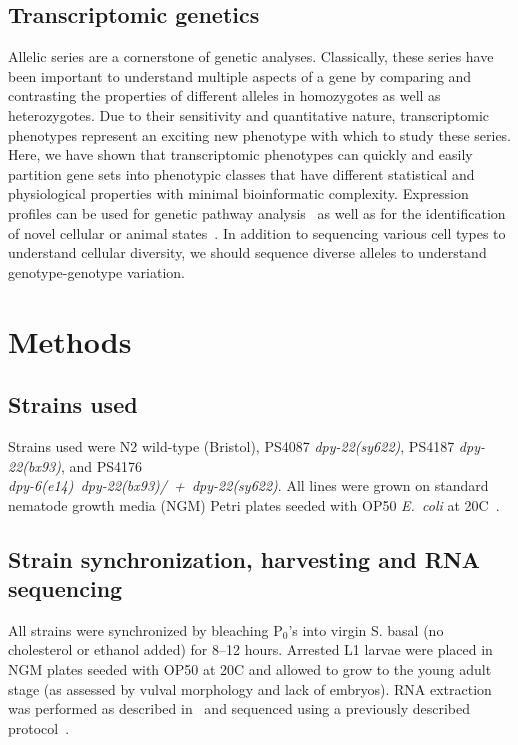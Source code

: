 \documentclass[10pt, twocolumn]{article}
\newcommand{\ecol}{\emph{E.~coli}}
\newcommand{\gene}[1]{\mbox{\emph{#1}}}
\begin{document}
\subsection*{Transcriptomic genetics}
Allelic series are a cornerstone of genetic analyses. Classically, these series
have been important to understand multiple aspects of a gene by comparing and
contrasting the properties of different alleles in homozygotes as well as
heterozygotes. Due to their sensitivity and quantitative nature, transcriptomic
phenotypes represent an exciting new phenotype with which to study these series.
Here, we have shown that transcriptomic phenotypes can quickly and easily
partition gene sets into phenotypic classes that have different statistical and
physiological properties with minimal bioinformatic complexity. Expression
profiles can be used for genetic pathway analysis~\cite{Dixit2016} as well as
for the identification of novel cellular or animal
states~\cite{Angeles-Albores2017,Villani2017}. In addition to sequencing
various cell types to understand cellular diversity, we should sequence diverse
alleles to understand genotype-genotype variation.

\section*{Methods}
\label{sec:methods}
\subsection*{Strains used}
Strains used were N2 wild-type (Bristol),
PS4087 \gene{dpy-22(sy622)},
PS4187 \gene{dpy-22(bx93)},
and PS4176\\ \gene{dpy-6(e14) dpy-22(bx93)/ + dpy-22(sy622)}.
All lines were grown on standard nematode growth media (NGM) Petri plates seeded
with OP50 \ecol{} at 20\degree{}C~\cite{Brenner1974}.

\subsection*{Strain synchronization, harvesting and RNA sequencing}
All strains were synchronized by bleaching
P$_0$'s into virgin S. basal (no cholesterol or ethanol added) for 8--12 hours.
Arrested L1 larvae were placed in NGM plates seeded with OP50 at 20\degree{}C
and allowed to grow to the young adult stage (as assessed by vulval morphology
and lack of  embryos). RNA extraction was performed as described in~\cite{} and
sequenced using a previously described protocol~\cite{Angeles-Albores2017}.
\end{document}
